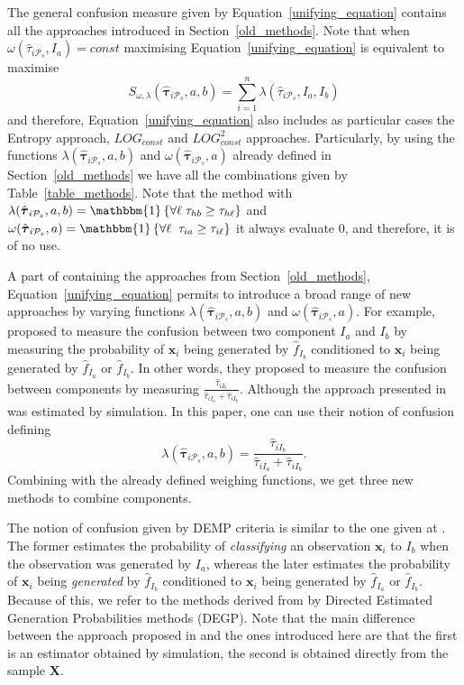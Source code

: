 \documentclass[10pt, a4paper]{article}
\newcommand{\m}[1]{\boldsymbol{#1}}
\begin{document}
\begin{spacing}{1.9}
The general confusion measure given by Equation~\ref{unifying_equation} contains all the approaches introduced in Section~\ref{old_methods}. Note that when $\omega(\hat{\tau}_{i \mathcal{P}_s}, I_a) = const$ maximising Equation~\ref{unifying_equation} is equivalent to maximise
\[
S_{\omega, \lambda}( \hat{\m \tau}_{i \mathcal{P}_s}, a, b) = \sum_{i=1}^n \lambda(\hat{\tau}_{i \mathcal{P}_s}, I_a, I_b)
\]
and therefore, Equation~\ref{unifying_equation} also includes as particular cases the Entropy approach, $LOG_{const}$ and $LOG^2_{const}$ approaches. Particularly, by using the functions $\lambda(\hat{\m \tau}_{i \mathcal{P}_s}, a, b)$ and $\omega(\hat{\m \tau}_{i \mathcal{P}_s}, a)$ already defined in Section~\ref{old_methods} we have all the combinations given by Table~\ref{table_methods}. Note that the method with $\lambda(\hat{\m \tau}_{i \mathcal{P}_s}, a, b) =  \mathlarger{\mathbbm{1}}\left\{  \forall \ell \; \tau_{hb} \geq \tau_{h\ell}  \right\}$ and  $\omega(\hat{\m \tau}_{i \mathcal{P}_s}, a) = \mathlarger{\mathbbm{1}}\left\{  \forall \ell\; \; \tau_{ia} \geq \tau_{i\ell}  \right\}$ it always evaluate 0, and therefore, it is of no use.

A part of containing the approaches from Section~\ref{old_methods}, Equation~\ref{unifying_equation} permits to introduce a broad range of new approaches by varying functions $\lambda(\hat{\m \tau}_{i \mathcal{P}_s}, a, b)$ and $\omega(\hat{\m \tau}_{i \mathcal{P}_s}, a)$. For example, \cite{longford2014} proposed to measure the confusion between two component $I_a$ and $I_b$ by measuring the probability of $\m x_i$ being generated by $\hat{f}_{I_b}$ conditioned to $\m x_i$  being generated by $\hat{f}_{I_a}$ or $\hat{f}_{I_b}$. In other words, they proposed to measure the confusion between components by measuring $\frac{\hat{\tau}_{iI_b}}{\hat{\tau}_{iI_a} + \hat{\tau}_{iI_b}}$. Although the approach presented in \cite{longford2014} was estimated by simulation. In this paper, one can use their notion of confusion defining
\[\lambda(\hat{\m \tau}_{i \mathcal{P}_s}, a, b) = \frac{\hat{\tau}_{iI_b}}{\hat{\tau}_{iI_a} + \hat{\tau}_{iI_b}}.\]
Combining with the already defined weighing functions, we get three new methods to combine components. 

The notion of confusion given by DEMP criteria is similar to the one given at \cite{longford2014}. The former estimates the probability of \emph{classifying} an observation $\m x_i$ to $I_b$ when the observation was generated by $I_a$, whereas the later estimates the probability of $\m x_i$ being \emph{generated} by $\hat{f}_{I_b}$ conditioned to $\m x_i$  being generated by $\hat{f}_{I_a}$ or $\hat{f}_{I_b}$. Because of this, we refer to the methods derived from \cite{longford2014} by Directed Estimated Generation Probabilities methods (DEGP). Note that the main difference between the approach proposed in \cite{longford2014} and the ones introduced here are that the first is an estimator obtained by simulation, the second is obtained directly from the sample $\m X$.



\end{spacing}
\end{document}
